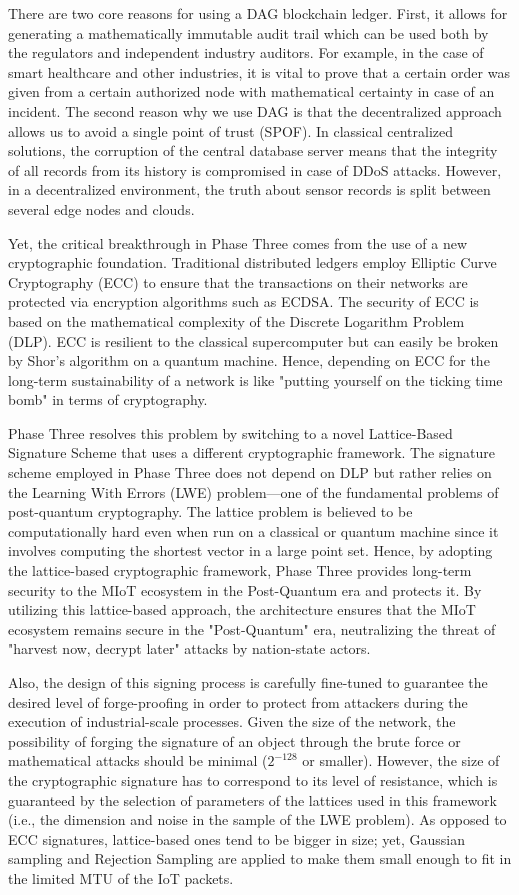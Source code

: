 \documentclass[a4paper,fleqn]{cas-dc}
\numberwithin{equation}{section}
\begin{document}
There are two core reasons for using a DAG blockchain ledger. First, it allows for generating a mathematically immutable audit trail which can be used both by the regulators and independent industry auditors. For example, in the case of smart healthcare and other industries, it is vital to prove that a certain order was given from a certain authorized node with mathematical certainty in case of an incident. The second reason why we use DAG is that the decentralized approach allows us to avoid a single point of trust (SPOF). In classical centralized solutions, the corruption of the central database server means that the integrity of all records from its history is compromised in case of DDoS attacks. However, in a decentralized environment, the truth about sensor records is split between several edge nodes and clouds.

Yet, the critical breakthrough in Phase Three comes from the use of a new cryptographic foundation. Traditional distributed ledgers employ Elliptic Curve Cryptography (ECC) to ensure that the transactions on their networks are protected via encryption algorithms such as ECDSA. The security of ECC is based on the mathematical complexity of the Discrete Logarithm Problem (DLP). ECC is resilient to the classical supercomputer but can easily be broken by Shor’s algorithm on a quantum machine. Hence, depending on ECC for the long-term sustainability of a network is like "putting yourself on the ticking time bomb" in terms of cryptography.

Phase Three resolves this problem by switching to a novel Lattice-Based Signature Scheme that uses a different cryptographic framework. The signature scheme employed in Phase Three does not depend on DLP but rather relies on the Learning With Errors (LWE) problem—one of the fundamental problems of post-quantum cryptography. The lattice problem is believed to be computationally hard even when run on a classical or quantum machine since it involves computing the shortest vector in a large point set. Hence, by adopting the lattice-based cryptographic framework, Phase Three provides long-term security to the MIoT ecosystem in the Post-Quantum era and protects it. By utilizing this lattice-based approach, the architecture ensures that the MIoT ecosystem remains secure in the "Post-Quantum" era, neutralizing the threat of "harvest now, decrypt later" attacks by nation-state actors.

Also, the design of this signing process is carefully fine-tuned to guarantee the desired level of forge-proofing in order to protect from attackers during the execution of industrial-scale processes. Given the size of the network, the possibility of forging the signature of an object through the brute force or mathematical attacks should be minimal ($2^{-128}$ or smaller). However, the size of the cryptographic signature has to correspond to its level of resistance, which is guaranteed by the selection of parameters of the lattices used in this framework (i.e., the dimension and noise in the sample of the LWE problem). As opposed to ECC signatures, lattice-based ones tend to be bigger in size; yet, Gaussian sampling and Rejection Sampling are applied to make them small enough to fit in the limited MTU of the IoT packets.
\end{document}
